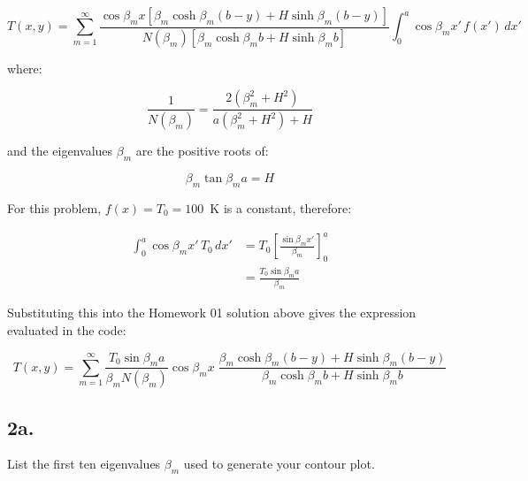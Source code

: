 \documentclass[letterpaper,12pt]{article}
\begin{document}
\begin{equation}
    T(x, y) = \sum_{m = 1}^{\infty} \frac{\cos{\beta_m x} \left[ \beta_m \cosh{\beta_m (b - y)} + H \sinh{\beta_m (b - y)} \right]}{N(\beta_m) \left[ \beta_m \cosh{\beta_m b} + H \sinh{\beta_m b} \right]} \int_{0}^{a} \cos{\beta_m x'} \, f(x') \, dx'
\end{equation}

where:

\begin{equation}
    \frac{1}{N(\beta_m)} = \frac{2 \left( \beta^{2}_m + H^2 \right)}{a \left( \beta^{2}_m + H^2 \right) + H}
\end{equation}

and the eigenvalues $\beta_m$ are the positive roots of:

\begin{equation}
    \beta_m \tan{\beta_m a} = H
\end{equation}

For this problem, $f(x) = T_0 = 100$~K is a constant, therefore:

\begin{equation}
\begin{aligned}
    \int_{0}^{a} \cos{\beta_m x'} \, T_0 \, dx' &= T_0 \left[ \frac{\sin{\beta_m x'}}{\beta_m} \right]_{0}^{a} \\[6pt]
                                                &= \frac{T_0 \sin{\beta_m a}}{\beta_m}
\end{aligned}
\end{equation}

Substituting this into the Homework 01 solution above gives the expression evaluated in the code:

\begin{equation}
    T(x, y) = \sum_{m = 1}^{\infty} \frac{T_0 \sin{\beta_m a}}{\beta_m N(\beta_m)} \cos{\beta_m x} \; \frac{\beta_m \cosh{\beta_m (b - y)} + H \sinh{\beta_m (b - y)}}{\beta_m \cosh{\beta_m b} + H \sinh{\beta_m b}}
\end{equation}


\subsection*{2a.}
List the first ten eigenvalues $\beta_m$ used to generate your contour plot.

\vspace{6pt}
\end{document}
